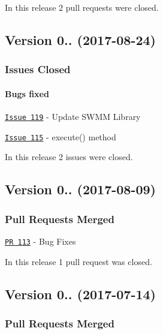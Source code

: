 In this release 2 pull requests were closed.

\subsection*{Version 0.. (2017-\/08-\/24)}

\subsubsection*{Issues Closed}

\paragraph*{Bugs fixed}


\begin{DoxyItemize}
\item \href{https://github.com/OpenWaterAnalytics/pyswmm/issues/119}{\tt Issue 119} -\/ Update S\+W\+MM Library
\item \href{https://github.com/OpenWaterAnalytics/pyswmm/issues/115}{\tt Issue 115} -\/ execute() method
\end{DoxyItemize}

In this release 2 issues were closed.

\subsection*{Version 0.. (2017-\/08-\/09)}

\subsubsection*{Pull Requests Merged}


\begin{DoxyItemize}
\item \href{https://github.com/OpenWaterAnalytics/pyswmm/pull/113}{\tt PR 113} -\/ Bug Fixes
\end{DoxyItemize}

In this release 1 pull request was closed.

\subsection*{Version 0.. (2017-\/07-\/14)}

\subsubsection*{Pull Requests Merged}


